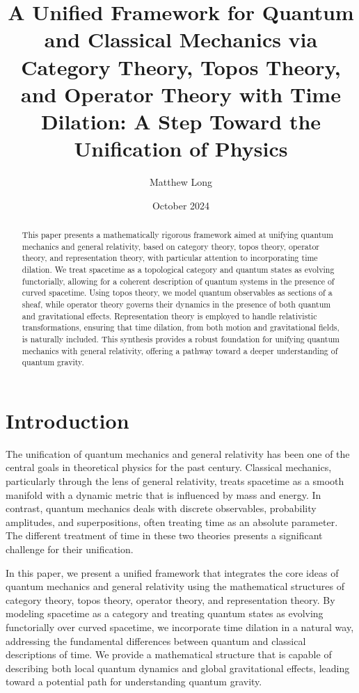 \documentclass{article}
\title{A Unified Framework for Quantum and Classical Mechanics via Category Theory, Topos Theory, and Operator Theory with Time Dilation: A Step Toward the Unification of Physics}
\author{Matthew Long}
\date{October 2024}
\begin{document}
\maketitle

\begin{abstract}
This paper presents a mathematically rigorous framework aimed at unifying quantum mechanics and general relativity, based on category theory, topos theory, operator theory, and representation theory, with particular attention to incorporating time dilation. We treat spacetime as a topological category and quantum states as evolving functorially, allowing for a coherent description of quantum systems in the presence of curved spacetime. Using topos theory, we model quantum observables as sections of a sheaf, while operator theory governs their dynamics in the presence of both quantum and gravitational effects. Representation theory is employed to handle relativistic transformations, ensuring that time dilation, from both motion and gravitational fields, is naturally included. This synthesis provides a robust foundation for unifying quantum mechanics with general relativity, offering a pathway toward a deeper understanding of quantum gravity.
\end{abstract}

\section{Introduction}

The unification of quantum mechanics and general relativity has been one of the central goals in theoretical physics for the past century. Classical mechanics, particularly through the lens of general relativity, treats spacetime as a smooth manifold with a dynamic metric that is influenced by mass and energy. In contrast, quantum mechanics deals with discrete observables, probability amplitudes, and superpositions, often treating time as an absolute parameter. The different treatment of time in these two theories presents a significant challenge for their unification.

In this paper, we present a unified framework that integrates the core ideas of quantum mechanics and general relativity using the mathematical structures of category theory, topos theory, operator theory, and representation theory. By modeling spacetime as a category and treating quantum states as evolving functorially over curved spacetime, we incorporate time dilation in a natural way, addressing the fundamental differences between quantum and classical descriptions of time. We provide a mathematical structure that is capable of describing both local quantum dynamics and global gravitational effects, leading toward a potential path for understanding quantum gravity.
\end{document}
